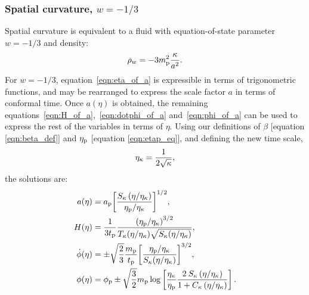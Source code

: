 \subsubsection{Spatial curvature, \(w=-1/3\)}
Spatial curvature is equivalent to a fluid with equation-of-state parameter \(w=-1/3\) and density:
%
\begin{equation}
  \rho_w = -3m_{\mathrm{p}}^2\frac{\kappa}{a^{2}}.
\end{equation}
%
For \(w=-1/3\), equation~\eqref{eqn:eta_of_a} is expressible in terms of trigonometric functions, and may be rearranged to express the scale factor \(a\) in terms of conformal time. Once \(a(\eta)\) is obtained, the remaining equations~\eqref{eqn:H_of_a},~\eqref{eqn:dotphi_of_a} and~\eqref{eqn:phi_of_a} can be used to express the rest of the variables in terms of \(\eta\). Using our definitions of \(\beta\) [equation \nolinebreak\ref{eqn:beta_def}] and \(\eta_{\mathrm{p}}\) [equation \nolinebreak\ref{eqn:etap_eq}], and defining the new time scale,
%
\begin{equation}
  \eta_\mathrm{\kappa} = \frac{1}{2\sqrt{\kappa}},
  \label{eqn:etak}
\end{equation}
%
the solutions are:
%
\begin{align}
  a(\eta)
  &=
  a_{\mathrm{p}}{\left[
  \frac
  {S_\kappa\left(\eta/\eta_\mathrm{\kappa}\right)}
  {\eta_{\mathrm{p}}/\eta_\mathrm{\kappa}} \right]}^{1/2},
  \\
  H(\eta)
  &=
  \frac{1}{3t_{\mathrm{p}}}
  \frac{{(\eta_{\mathrm{p}}/\eta_\mathrm{\kappa})}^{3/2}}
  {T_\kappa(\eta/\eta_\mathrm{\kappa})\sqrt{S_\kappa(\eta/\eta_\mathrm{\kappa})}}, 
  \\
  \dot{\phi}(\eta)
  &=
  \pm\sqrt{\frac{2}{3}}
  \frac{m_{\mathrm{p}}}{t_{\mathrm{p}}}
  {\left[
  \frac
  {\eta_{\mathrm{p}}/\eta_\mathrm{\kappa}}
  {S_{\kappa}(\eta/\eta_\mathrm{\kappa})}
  \right]}^{3/2},
  \\
  \phi(\eta) 
  &=
  \phi_{\mathrm{p}} \pm \sqrt{\frac{3}{2}}m_{\mathrm{p}}\log  \left[
  \frac{\eta_\mathrm{\kappa}}{\eta_{\mathrm{p}}} 
  \frac{2\:S_{\kappa}\left(\eta/\eta_\mathrm{\kappa} \right) }
  {1 + C_{\kappa} \left( \eta/\eta_\mathrm{\kappa} \right)   }  
  \right]. 
\end{align}
%



